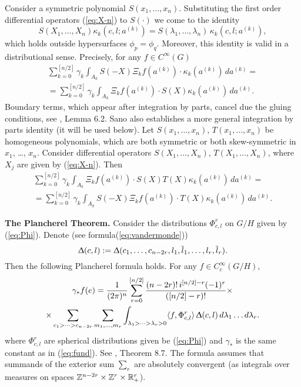 \documentclass{article}
\newcounter{sec}
\def\sm{\smallskip}
\newcounter{punct}[sec]
\def\punct{\refstepcounter{punct}{\arabic{sec}.\arabic{punct}.  }}
\begin{document}
Consider a  symmetric polynomial
$S(x_1,\dots,x_n)$. Substituting the first order differential operators 
(\ref{eq:X-n}) to $S(\cdot)$ we come to the
identity
$$
S(X_1,\dots,X_n)\kappa_k(c,l;a^{(k)})=S(\lambda_1,\dots,\lambda_n)\,\kappa_k(c,l;a^{(k)}),
$$
which  holds
outside hypersurfaces $\phi_p=\phi_q$. Moreover, this identity is valid 
in a distributional sense. Precisely, for any $f\in C^\infty(G)$
\begin{multline*}
\sum_{k=0}^{[n/2]}\gamma_k\int_{A_k} S(-X) \Xi_k f(a^{(k)})\cdot \kappa_k(a^{(k)})\,da^{(k)}
=\\=\sum_{k=0}^{[n/2]}\gamma_k\int_{A_k}  \Xi_k f(a^{(k)})\cdot S(X) \kappa_k(a^{(k)})\,da^{(k)}.
\end{multline*}
Boundary terms, which appear after integration by parts,  cancel due the gluing
conditions, see \cite{San}, Lemma 6.2. Sano also establishes a more general integration by parts identity
(it will be used below).
Let $S(x_1,\dots,x_n)$,  $T(x_1,\dots,x_n)$ be homogeneous polynomials,
which are both symmetric or both skew-symmetric in $x_1$, \dots, $x_n$.
Consider differential operators $S(X_1,\dots,X_n)$, $T(X_1,\dots,X_n)$, where
$X_j$ are given by (\ref{eq:X-n}). Then
\begin{multline}
\sum_{k=0}^{[n/2]}\gamma_k\int_{A_k}  \Xi_k f(a^{(k)})\cdot S(X) T(X) \kappa_k(a^{(k)})\,da^{(k)}
=\\=
\sum_{k=0}^{[n/2]}\gamma_k\int_{A_k} S(-X) \Xi_k f(a^{(k)})\cdot T(X) \kappa_k(a^{(k)})\,da^{(k)}.
\label{eq:by-parts}
\end{multline}

\sm

{\bf \punct The Plancherel Theorem.}
Consider the distributions $\Phi^r_{c,l}$ on $G/H$ given by 
(\ref{eq:Phi}). Denote (see formula(\ref{eq:vandermonde}))
$$
\Updelta(c,l):=\Updelta(c_1,\dots,c_{n-2r},l_1,\overline l_1,\dots, l_r,\overline l_r).
$$
Then the following Plancherel  formula holds.
For any $f\in C_c^\infty(G/H)$,
\begin{multline}
\gamma_* f(e)=
\frac 1{(2\pi)^n}\sum_{r=0}^{[n/2]}
\frac{(n-2r)!\, i^{[n/2]-r} (-1)^r}{([n/2]-r)!}
\times \\ \times
\sum_{c_1>\dots>c_{n-2r}}
\sum_{m_1,\dots,m_r}
\int_{\lambda_1>\dots>\lambda_r>0}
\langle f, \Phi^r_{c,l}\rangle\, \Updelta(c,l)\,d\lambda_1\dots d\lambda_r.
\label{eq:plancherel}
\end{multline}
where $\Phi^r_{c,l}$ are spherical distributions
given be (\ref{eq:Phi}) and
$\gamma_*$ is the same constant as in (\ref{eq:fund}).
See \cite{San}, Theorem 8.7.
The formula assumes that
summands of the exterior sum $\sum_r$  are absolutely convergent (as  integrals over  measures
on spaces ${\mathbb Z}^{n-2r}\times {\mathbb Z}^r\times {\mathbb R }_+^r$).
\end{document}
